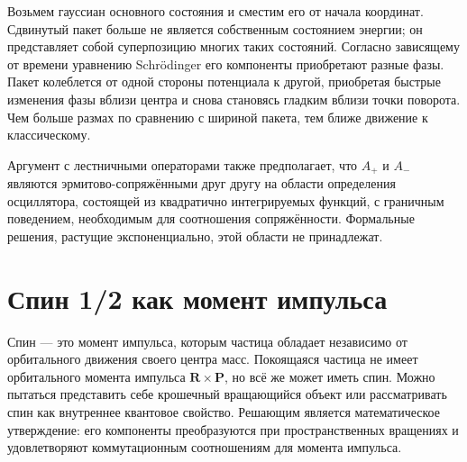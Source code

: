 Возьмем гауссиан основного состояния и сместим его от начала координат. Сдвинутый пакет больше не является собственным состоянием энергии; он представляет собой суперпозицию многих таких состояний. Согласно зависящему от времени уравнению Schr\"odinger его компоненты приобретают разные фазы. Пакет колеблется от одной стороны потенциала к другой, приобретая быстрые изменения фазы вблизи центра и снова становясь гладким вблизи точки поворота. Чем больше размах по сравнению с шириной пакета, тем ближе движение к классическому.

\begin{classroomqa}
\end{classroomqa}

Аргумент с лестничными операторами также предполагает, что \(A_{+}\) и \(A_{-}\) являются эрмитово-сопряжёнными друг другу на области определения осциллятора, состоящей из квадратично интегрируемых функций, с граничным поведением, необходимым для соотношения сопряжённости. Формальные решения, растущие экспоненциально, этой области не принадлежат.

\begin{classroomqa}
\end{classroomqa}

\section{Спин 1/2 как момент импульса}

Спин — это момент импульса, которым частица обладает независимо от орбитального движения своего центра масс. Покоящаяся частица не имеет орбитального момента импульса \(\mathbf R\times\mathbf P\), но всё же может иметь спин. Можно пытаться представить себе крошечный вращающийся объект или рассматривать спин как внутреннее квантовое свойство. Решающим является математическое утверждение: его компоненты преобразуются при пространственных вращениях и удовлетворяют коммутационным соотношениям для момента импульса.

